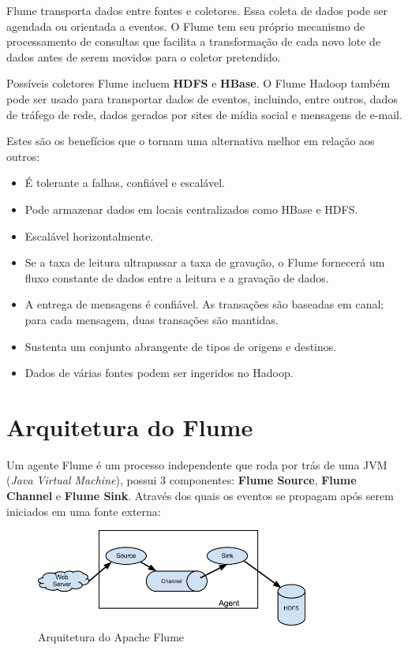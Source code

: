 \documentclass[a4paper,11pt]{article}
\begin{document}
Flume transporta dados entre fontes e coletores. Essa coleta de dados pode ser agendada ou orientada a eventos. O Flume tem seu próprio mecanismo de processamento de consultas que facilita a transformação de cada novo lote de dados antes de serem movidos para o coletor pretendido.

Possíveis coletores Flume incluem \textbf{HDFS} e \textbf{HBase}. O Flume Hadoop também pode ser usado para transportar dados de eventos, incluindo, entre outros, dados de tráfego de rede, dados gerados por sites de mídia social e mensagens de e-mail.

Estes são os benefícios que o tornam uma alternativa melhor em relação aos outros: \vspace{-1em}
\begin{itemize}
	\item É tolerante a falhas, confiável e escalável.
	\item Pode armazenar dados em locais centralizados como HBase e HDFS.
	\item Escalável horizontalmente.
	\item Se a taxa de leitura ultrapassar a taxa de gravação, o Flume fornecerá um fluxo
	constante de dados entre a leitura e a gravação de dados.
	\item A entrega de mensagens é confiável. As transações são baseadas em canal; para cada mensagem, duas transações são mantidas.
	\item Sustenta um conjunto abrangente de tipos de origens e destinos.
	\item Dados de várias fontes podem ser ingeridos no Hadoop.
\end{itemize}

\section{Arquitetura do Flume}
Um agente Flume é um processo independente que roda por trás de uma JVM (\textit{Java Virtual Machine}), possui 3 componentes: \textbf{Flume Source}, \textbf{Flume Channel} e \textbf{Flume Sink}. Através dos quais os eventos se propagam após serem iniciados em uma fonte externa:
\begin{figure}[H]
	\centering
	\includegraphics[width=0.8\textwidth]{imagem/arquitetura}
	\caption{Arquitetura do Apache Flume}
\end{figure}
\end{document}
